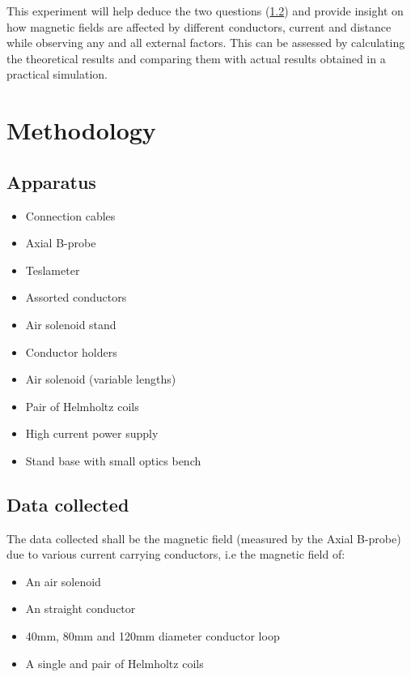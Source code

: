 \documentclass[12pt]{article}
\begin{document}
This experiment will help deduce the two questions (\cref{Data Collected}) and provide insight on how magnetic fields are affected by different conductors, current and distance while observing any and all external factors. This can be assessed by calculating the theoretical results and comparing them with actual results obtained in a practical simulation.

\section{Methodology}
\subsection{Apparatus}
\begin{multicols}{2}
\begin{itemize}
	\item Connection cables
	\item Axial B-probe
    \item Teslameter
    \item Assorted conductors
    \item Air solenoid stand
    \item Conductor holders
	\item Air solenoid (variable lengths)
    \item Pair of Helmholtz coils
    \item High current power supply
    \item Stand base with small optics bench
\end{itemize}
\end{multicols}

\subsection{Data collected}
\label{Data Collected}
The data collected shall be the magnetic field (measured by the Axial B-probe) due to various current carrying conductors, i.e the magnetic field of:
\begin{multicols}{2}
\begin{itemize}
    \item An air solenoid
    \item An straight conductor
    \item 40mm, 80mm and 120mm diameter conductor loop
    \item A single and pair of Helmholtz coils
\end{itemize}
\end{multicols} 
\end{document}
